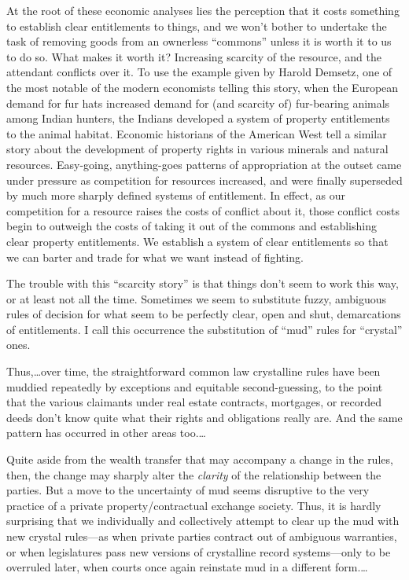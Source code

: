 At the root of these economic analyses lies the perception that it costs
something to establish clear entitlements to things, and we won't bother to
undertake the task of removing goods from an ownerless ``commons'' unless it is
worth it to us to do so. What makes it worth it? Increasing scarcity of the
resource, and the attendant conflicts over it. To use the example given by
Harold Demsetz, one of the most notable of the modern economists telling this
story, when the European demand for fur hats increased demand for (and scarcity
of) fur-bearing animals among Indian hunters, the Indians developed a system of
property entitlements to the animal habitat. Economic historians of the
American West tell a similar story about the development of property rights in
various minerals and natural resources. Easy-going, anything-goes patterns of
appropriation at the outset came under pressure as competition for resources
increased, and were finally superseded by much more sharply defined systems of
entitlement.  In effect, as our competition for a resource raises the costs of
conflict about it, those conflict costs begin to outweigh the costs of taking
it out of the commons and establishing clear property entitlements. We
establish a system of clear entitlements so that we can barter and trade for
what we want instead of fighting. 

The trouble with this ``scarcity story'' is that things don't seem to work this
way, or at least not all the time. Sometimes we seem to substitute fuzzy,
ambiguous rules of decision for what seem to be perfectly clear, open and shut,
demarcations of entitlements. I call this occurrence the substitution of ``mud''
rules for ``crystal'' ones.

Thus,\dots over time, the straightforward common law crystalline rules have
been muddied repeatedly by exceptions and equitable second-guessing, to the
point that the various claimants under real estate contracts, mortgages, or
recorded deeds don't know quite what their rights and obligations really are.
And the same pattern has occurred in other areas too.\dots

Quite aside from the wealth transfer that may accompany a change in the rules,
then, the change may sharply alter the \textit{clarity} of the relationship
between the parties. But a move to the uncertainty of mud seems disruptive to
the very practice of a private property/contractual exchange society. Thus, it
is hardly surprising that we individually and collectively attempt to clear up
the mud with new crystal rules---as when private parties contract out of
ambiguous warranties, or when legislatures pass new versions of crystalline
record systems---only to be overruled later, when courts once again reinstate
mud in a different form.\dots

